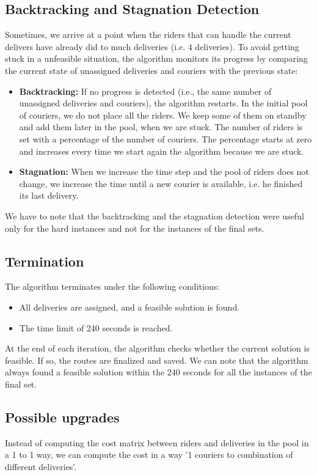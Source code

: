 \documentclass[a4paper]{article}
\begin{document}
\subsection{Backtracking and Stagnation Detection}
Sometimes, we arrive at a point when the riders that can handle the current delivers have already did to much deliveries (i.e. 4 deliveries). To avoid getting stuck in a unfeasible situation, the algorithm monitors its progress by comparing the current state of unassigned deliveries and couriers with the previous state:
\begin{itemize}
    \item \textbf{Backtracking:} If no progress is detected (i.e., the same number of unassigned deliveries and couriers), the algorithm restarts. In the initial pool of couriers, we do not place all the riders. We keep some of them on standby and add them later in the pool, when we are stuck. The number of  riders is set with a percentage of the number of couriers. The percentage starts at zero and increases every time we start again the algorithm because we are stuck.
    \item \textbf{Stagnation:} When we increase the time step and the pool of riders does not change, we increase the time until a new courier is available, i.e. he finished its last delivery.
\end{itemize}
We have to note that the backtracking and the stagnation detection were useful only for the hard instances and not for the instances of the final sets.
\subsection{Termination}
The algorithm terminates under the following conditions:
\begin{itemize}
    \item All deliveries are assigned, and a feasible solution is found.
    \item The time limit of 240 seconds is reached.
\end{itemize}
At the end of each iteration, the algorithm checks whether the current solution is feasible. If so, the routes are finalized and saved. We can note that the algorithm always found a feasible solution within the 240 seconds for all the instances of the final set.

\subsection{Possible upgrades}
Instead of computing the cost matrix between riders and deliveries in the pool in a 1 to 1 way, we can compute the cost in a way '1 couriers to combination of different deliveries'.
\fi
\end{document}
